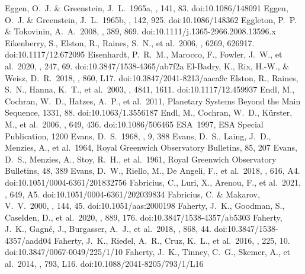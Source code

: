 \documentclass[twocolumn,tighten,twocolappendix]{aastex631}
\begin{document}
\begin{thebibliography}{}
 Eggen, O.~J. \& Greenstein, J.~L.\ 1965a, \apj, 141, 83. doi:10.1086/148091
 Eggen, O.~J. \& Greenstein, J.~L.\ 1965b, \apj, 142, 925. doi:10.1086/148362
 Eggleton, P.~P. \& Tokovinin, A.~A.\ 2008, \mnras, 389, 869. doi:10.1111/j.1365-2966.2008.13596.x
 Eikenberry, S., Elston, R., Raines, S.~N., et al.\ 2006, \procspie, 6269, 626917. doi:10.1117/12.672095
 Eisenhardt, P.~R.~M., Marocco, F., Fowler, J.~W., et al.\ 2020, \apjs, 247, 69. doi:10.3847/1538-4365/ab7f2a
 El-Badry, K., Rix, H.-W., \& Weisz, D.~R.\ 2018, \apjl, 860, L17. doi:10.3847/2041-8213/aaca9c
 Elston, R., Raines, S.~N., Hanna, K.~T., et al.\ 2003, \procspie, 4841, 1611. doi:10.1117/12.459937
 Endl, M., Cochran, W.~D., Hatzes, A.~P., et al.\ 2011, Planetary Systems Beyond the Main Sequence, 1331, 88. doi:10.1063/1.3556187
 Endl, M., Cochran, W.~D., K{\"u}rster, M., et al.\ 2006, \apj, 649, 436. doi:10.1086/506465
 ESA\ 1997, ESA Special Publication, 1200
 Evans, D.~S.\ 1968, \qjras, 9, 388
 Evans, D.~S., Laing, J.~D., Menzies, A., et al.\ 1964, Royal Greenwich Observatory Bulletins, 85, 207
 Evans, D.~S., Menzies, A., Stoy, R.~H., et al.\ 1961, Royal Greenwich Observatory Bulletins, 48, 389
 Evans, D.~W., Riello, M., De Angeli, F., et al.\ 2018, \aap, 616, A4. doi:10.1051/0004-6361/201832756
 Fabricius, C., Luri, X., Arenou, F., et al.\ 2021, \aap, 649, A5. doi:10.1051/0004-6361/202039834
 Fabricius, C. \& Makarov, V.~V.\ 2000, \aaps, 144, 45. doi:10.1051/aas:2000198
 Faherty, J.~K., Goodman, S., Caselden, D., et al.\ 2020, \apj, 889, 176. doi:10.3847/1538-4357/ab5303
 Faherty, J.~K., Gagn{\'e}, J., Burgasser, A.~J., et al.\ 2018, \apj, 868, 44. doi:10.3847/1538-4357/aadd04
 Faherty, J.~K., Riedel, A.~R., Cruz, K.~L., et al.\ 2016, \apjs, 225, 10. doi:10.3847/0067-0049/225/1/10
 Faherty, J.~K., Tinney, C.~G., Skemer, A., et al.\ 2014, \apjl, 793, L16. doi:10.1088/2041-8205/793/1/L16

\end{thebibliography}
\end{document}
